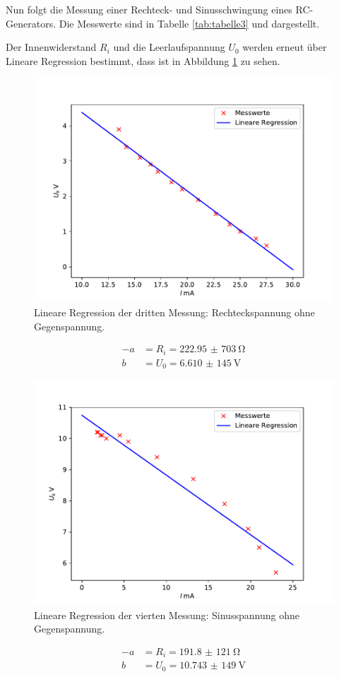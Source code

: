 \noindent Nun folgt die Messung einer Rechteck- und Sinusschwingung eines RC-Generators.
Die Messwerte sind in Tabelle \ref{tab:tabelle3} und dargestellt.

\noindent Der Innenwiderstand $R_{i}$ und die Leerlaufspannung $U_{0}$ werden erneut über Lineare Regression
bestimmt, dass ist in Abbildung \ref{fig:plot3} zu sehen.
\begin{figure}[H]
  \centering
  \includegraphics{plot3.pdf}
  \caption{Lineare Regression der dritten Messung: Rechteckspannung ohne Gegenspannung.}
  \label{fig:plot3}
\end{figure}
\begin{align*}
  -a &= R_{i} = \SI{222,95(703)}{\ohm} \\
  b &= U_{0} = \SI{6,610(145)}{\volt}
\end{align*}

\begin{figure}[H]
  \centering
  \includegraphics{plot4.pdf}
  \caption{Lineare Regression der vierten Messung: Sinusspannung ohne Gegenspannung.}
  \label{fig:plot4}
\end{figure}
\begin{align*}
  -a &= R_{i} = \SI{191,8(121)}{\ohm} \\
  b &= U_{0} = \SI{10,743(149)}{\volt}
\end{align*}

